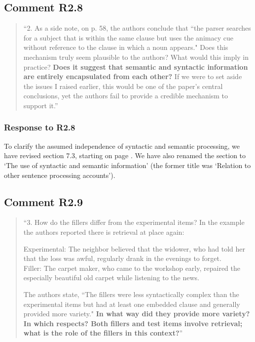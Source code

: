\documentclass[12pt]{article}
\begin{document}
 
\subsection*{Comment R2.8}
\begin{quote}
``2. As a side note, on p. 58, the authors conclude that ``the parser searches for a subject that is within the same clause but uses the animacy cue without reference to the clause in which a noun appears." Does this mechanism truly seem plausible to the authors? What would this imply in practice? \textbf{Does it suggest that semantic and syntactic information are entirely encapsulated from each other?} If we were to set aside the issues I raised earlier, this would be one of the paper's central conclusions, yet the authors fail to provide a credible mechanism to support it.''
\end{quote}
\subsubsection*{Response to R2.8}

To clarify the assumed independence of syntactic and semantic processing, we have revised section 7.3, starting on page \pageref{synsem}. We have also renamed the section to `The use of syntactic and semantic information' (the former title was `Relation to other sentence processing accounts').

\begin{quote}
\end{quote}

 
\subsection*{Comment R2.9}
\begin{quote}
``3. How do the fillers differ from the experimental items? In the example the authors reported there is retrieval at place again:

Experimental: The neighbor believed that the widower, who had told her that the loss was awful, regularly drank in the evenings to forget.\\
Filler: The carpet maker, who came to the workshop early, repaired the especially beautiful old carpet while listening to the news.

The authors state, ``The fillers were less syntactically complex than the experimental items but had at least one embedded clause and generally provided more variety." \textbf{In what way did they provide more variety? In which respects? Both fillers and test items involve retrieval; what is the role of the fillers in this context?}''
\end{quote}
\end{document}
